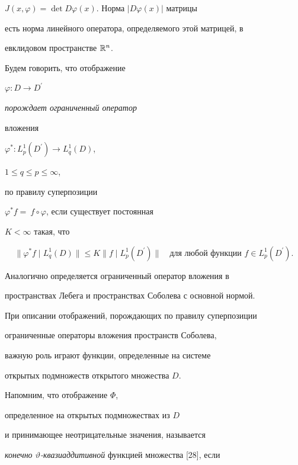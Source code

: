 $J(x,\varphi)=\det D\varphi(x)$. Норма $|D\varphi(x)|$ матрицы


есть норма линейного оператора, определяемого этой матрицей, в


евклидовом пространстве ${\Bbb R}^n$.





Будем говорить, что отображение


$\varphi:D\to D^{\prime}$


{\it порождает ограниченный оператор


вложения} $\varphi^{*} :L_{p}^{1}(D^{\prime})\to L_{q}^{1}(D)$,


$1\leq q\leq p \leq\infty$,


по правилу суперпозиции


$\varphi^{*}f=\ f\circ \varphi$, если существует постоянная


$K<\infty$ такая, что


$$


\|\varphi^{*}f\mid L_{q}^{1}(D)\|\leq


K\|f\mid L_{p}^{1}(D^{\prime})\|


\quad\text{для любой функции $f\in L_{p}^{1}(D^{\prime})$}.


$$


Аналогично определяется ограниченный оператор вложения в


пространствах Лебега и пространствах Соболева с основной нормой.





При описании отображений, порождающих по правилу суперпозиции


ограниченные операторы вложения пространств Соболева,


важную роль играют функции, определенные на системе


открытых подмножеств открытого множества $D$.





Напомним, что отображение $\Phi$,


определенное на открытых подмножествах из $D$


и принимающее неотрицательные значения, называется


{\it конечно $\vartheta$-квазиаддитивной} функцией множества [28], если


